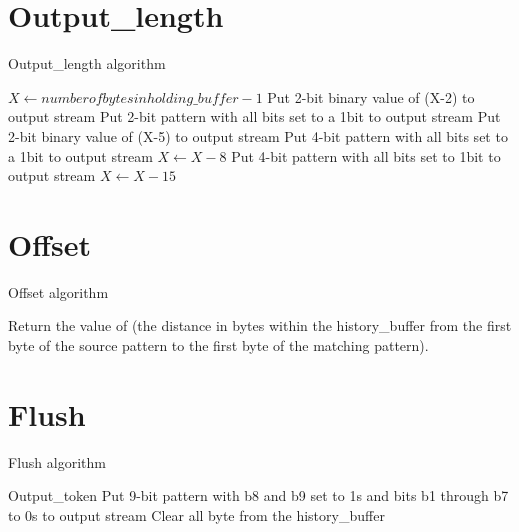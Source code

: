 \documentclass[10pt,letterpaper,pdftex]{article}
\begin{document}
\begin{CJK}{GBK}{song}
\newpage
\section{Output\_length}
\begin{algorithm}
\caption{Output\_length algorithm}\label{output_length}
\begin{algorithmic}[1]
 \State $X\gets number of bytes in holding\_buffer -1$
  \State Put 2-bit binary value of (X-2) to output stream
 \ElsIf 
   \State Put 2-bit pattern with all bits set to a 1bit to output stream
   \State Put 2-bit binary value of (X-5) to output stream
  \ElsIf
   \State Put 4-bit pattern with all bits set to a 1bit to output stream
   \State $X\gets X-8$
    \State Put 4-bit pattern with all bits set to 1bit to output stream
    \State $X\gets X-15$
   \EndWhile
  \EndIf
 \EndIf
\EndProcedure
\end{algorithmic}
\end{algorithm}

\newpage
\section{Offset}
\begin{algorithm}
\caption{Offset algorithm}\label{offsetlength}
\begin{algorithmic}[1]
Return the value of (the distance in bytes within the history\_buffer from the %
first byte of the source pattern to the first byte of the matching pattern).
\EndProcedure
\end{algorithmic}
\end{algorithm}

\newpage
\section{Flush}
\begin{algorithm}
\caption{Flush algorithm}\label{flush}
\begin{algorithmic}[1]
  \State Output\_token
 \EndWhile
 \State Put 9-bit pattern with b8 and b9 set to 1s and bits b1 through b7 to 0s to output stream
  \State Clear all byte from the history\_buffer 
 \EndIf
\EndProcedure
\end{algorithmic}
\end{algorithm}

\end{CJK}
\end{document}
